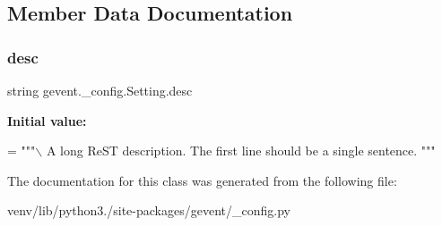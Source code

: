 \subsection{Member Data Documentation}
\mbox{\label{classgevent_1_1__config_1_1_setting_a560569d2e9adf0fa6a69a66d8c62e681}} 
\subsubsection{\texorpdfstring{desc}{desc}}
{\footnotesize\ttfamily string gevent.\+\_\+config.\+Setting.\+desc\hspace{0.3cm}{\ttfamily [static]}}

{\bfseries Initial value\+:}
\begin{DoxyCode}
=  \textcolor{stringliteral}{"""\(\backslash\)}
\textcolor{stringliteral}{}
\textcolor{stringliteral}{A long ReST description.}
\textcolor{stringliteral}{}
\textcolor{stringliteral}{The first line should be a single sentence.}
\textcolor{stringliteral}{}
\textcolor{stringliteral}{"""}
\end{DoxyCode}


The documentation for this class was generated from the following file\+:\begin{DoxyCompactItemize}
\item 
venv/lib/python3./site-\/packages/gevent/\+\_\+config.\+py\end{DoxyCompactItemize}
